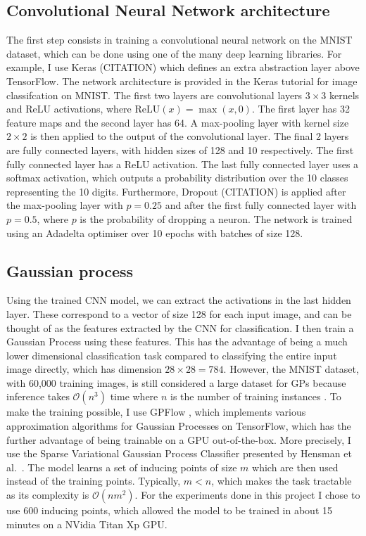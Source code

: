 \documentclass{article}
\begin{document}
\subsection{Convolutional Neural Network architecture}
The first step consists in training a convolutional neural network on the MNIST dataset, which can be done using one of the many deep learning libraries. For example, I use Keras (CITATION) which defines an extra abstraction layer above TensorFlow. The network architecture is provided in the Keras tutorial for image classifcation on MNIST. The first two layers are convolutional layers $3 \times 3$ kernels and ReLU activations, where $\textrm{ReLU}(x) = \max(x, 0)$. The first layer has 32 feature maps and the second layer has 64. A max-pooling layer with kernel size $2 \times 2$ is then applied to the output of the convolutional layer. The final 2 layers are fully connected layers, with hidden sizes of 128 and 10 respectively. The first fully connected layer has a ReLU activation. The last fully connected layer uses a softmax activation, which outputs a probability distribution over the 10 classes representing the 10 digits. Furthermore, Dropout (CITATION) is applied after the max-pooling layer with $p=0.25$ and after the first fully connected layer with $p=0.5$, where $p$ is the probability of dropping a neuron. The network is trained using an Adadelta optimiser over 10 epochs with batches of size 128.

\subsection{Gaussian process}
Using the trained CNN model, we can extract the activations in the last hidden layer. These correspond to a vector of size 128 for each input image, and can be thought of as the features extracted by the CNN for classification. I then train a Gaussian Process using these features. This has the advantage of being a much lower dimensional classification task compared to classifying the entire input image directly, which has dimension $28 \times 28 = 784$. However, the MNIST dataset, with 60,000 training images, is still considered a large dataset for GPs because inference takes $\mathcal{O}(n^3)$ time where $n$ is the number of training instances \cite{hensman2015scalable}. To make the training possible, I use GPFlow \cite{GPflow2017}, which implements various approximation algorithms for Gaussian Processes on TensorFlow, which has the further advantage of being trainable on a GPU out-of-the-box. More precisely, I use the Sparse Variational Gaussian Process Classifier presented by Hensman et al.\ \cite{hensman2015scalable}. The model learns a set of inducing points of size $m$ which are then used instead of the training points. Typically, $m < n$, which makes the task tractable as its complexity is $\mathcal{O}(nm^2)$. For the experiments done in this project I chose to use 600 inducing points, which allowed the model to be trained in about 15 minutes on a NVidia Titan Xp GPU.
\end{document}
